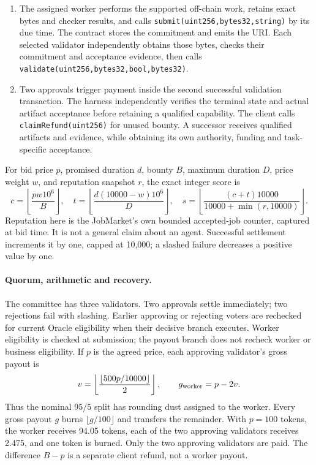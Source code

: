 \documentclass[11pt,letterpaper]{article}
\begin{document}
\begin{enumerate}
\item The assigned worker performs the supported off-chain work, retains exact bytes and checker results, and calls \texttt{submit(\allowbreak{}uint256,\allowbreak{}bytes32,\allowbreak{}string)} by its due time. The contract stores the commitment and emits the URI. Each selected validator independently obtains those bytes, checks their commitment and acceptance evidence, then calls \texttt{validate(\allowbreak{}uint256,\allowbreak{}bytes32,\allowbreak{}bool,\allowbreak{}bytes32)}.
\item Two approvals trigger payment inside the second successful validation transaction. The harness independently verifies the terminal state and actual artifact acceptance before retaining a qualified capability. The client calls \texttt{claimRefund(\allowbreak{}uint256)} for unused bounty. A successor receives qualified artifacts and evidence, while obtaining its own authority, funding and task-specific acceptance.
\end{enumerate}

For bid price \(p\), promised duration \(d\), bounty \(B\), maximum duration \(D\), price weight \(w\), and reputation snapshot \(r\), the exact integer score is
\[
c=\left\lfloor\frac{pw10^6}{B}\right\rfloor,\quad
t=\left\lfloor\frac{d(10000-w)10^6}{D}\right\rfloor,\quad
s=\left\lfloor\frac{(c+t)10000}{10000+\min(r,10000)}\right\rfloor .
\]
Reputation here is the JobMarket's own bounded accepted-job counter, captured at bid time. It is not a general claim about an agent. Successful settlement increments it by one, capped at 10,000; a slashed failure decreases a positive value by one.

\paragraph{Quorum, arithmetic and recovery.}
The committee has three validators. Two approvals settle immediately; two rejections fail with slashing. Earlier approving or rejecting voters are rechecked for current Oracle eligibility when their decisive branch executes. Worker eligibility is checked at submission; the payout branch does not recheck worker or business eligibility. If \(p\) is the agreed price, each approving validator's gross payout is
\[
v=\left\lfloor\frac{\left\lfloor500p/10000\right\rfloor}{2}\right\rfloor,\qquad
g_{\rm worker}=p-2v .
\]
Thus the nominal 95/5 split has rounding dust assigned to the worker. Every gross payout \(g\) burns \(\lfloor g/100\rfloor\) and transfers the remainder. With \(p=100\) tokens, the worker receives 94.05 tokens, each of the two approving validators receives 2.475, and one token is burned. Only the two approving validators are paid. The difference \(B-p\) is a separate client refund, not a worker payout.
\end{document}
